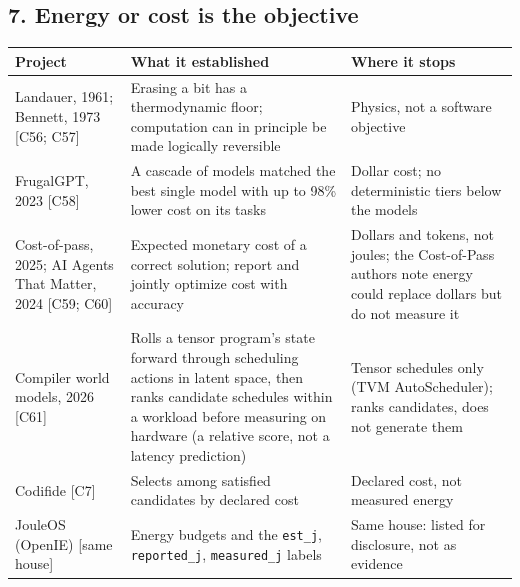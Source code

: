 \documentclass[10pt,letterpaper]{article}
\begin{document}
\subsection{7. Energy or cost is the
objective}\label{energy-or-cost-is-the-objective}

{\footnotesize\setlength{\tabcolsep}{3.8pt}\renewcommand{\arraystretch}{1.15}
\begin{longtable}[]{@{}
  >{\raggedright\arraybackslash}p{}
  >{\raggedright\arraybackslash}p{}
  >{\raggedright\arraybackslash}p{}@{}}
\toprule\noalign{}
\begin{minipage}[b]{\linewidth}\raggedright
\textbf{Project}
\end{minipage} & \begin{minipage}[b]{\linewidth}\raggedright
\textbf{What it established}
\end{minipage} & \begin{minipage}[b]{\linewidth}\raggedright
\textbf{Where it stops}
\end{minipage} \\
\midrule\noalign{}
\endhead
\bottomrule\noalign{}
\endlastfoot
Landauer, 1961; Bennett, 1973 {[}C56; C57{]} & Erasing a bit has a
thermodynamic floor; computation can in principle be made logically
reversible & Physics, not a software objective \\
FrugalGPT, 2023 {[}C58{]} & A cascade of models matched the best single
model with up to 98\% lower cost on its tasks & Dollar cost; no
deterministic tiers below the models \\
Cost-of-pass, 2025; AI Agents That Matter, 2024 {[}C59; C60{]} &
Expected monetary cost of a correct solution; report and jointly
optimize cost with accuracy & Dollars and tokens, not joules; the
Cost-of-Pass authors note energy could replace dollars but do not
measure it \\
Compiler world models, 2026 {[}C61{]} & Rolls a tensor program's state
forward through scheduling actions in latent space, then ranks candidate
schedules within a workload before measuring on hardware (a relative
score, not a latency prediction) & Tensor schedules only (TVM
AutoScheduler); ranks candidates, does not generate them \\
Codifide {[}C7{]} & Selects among satisfied candidates by declared cost
& Declared cost, not measured energy \\
JouleOS (OpenIE) {[}same house{]} & Energy budgets and the
\texttt{est\_j}, \texttt{reported\_\allowbreak{}j}, \texttt{measured\_\allowbreak{}j} labels &
Same house: listed for disclosure, not as evidence \\
\end{longtable}
}
\end{document}
